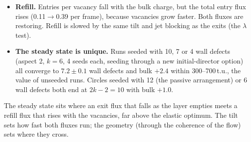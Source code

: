 \begin{itemize}
\begin{itemize}
        \end{itemize}
  \item \textbf{Refill.} Entries per vacancy fall with the bulk charge, but the total entry flux rises (0.11$\to$0.39 per frame), because vacancies grow faster. Both fluxes are restoring.
        Refill is slowed by the same tilt and jet blocking as the exits (the $\lambda$ test).
  \item \textbf{The steady state is unique.} Runs seeded with 10, 7 or 4 wall defects (aspect 2, $k=6$, 4 seeds each, seeding through a new initial-director option) all converge to
        $7.2\pm0.1$ wall defects and bulk $+2.4$ within 300--700\,t.u., the value of unseeded runs. Circles seeded with 12 (the passive arrangement) or 6 wall defects both end at $2k-2=10$ with bulk $+1.0$.
\end{itemize}
The steady state sits where an exit flux that falls as the layer empties meets a refill flux that rises with the vacancies, far above the elastic optimum. The tilt sets how fast both
fluxes run; the geometry (through the coherence of the flow) sets where they cross.


